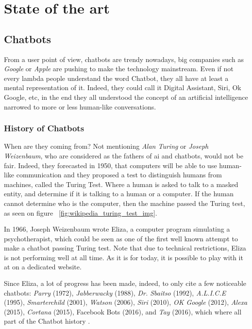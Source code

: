 

\chapter{State of the art}
\label{chap:state-of-the-art}

\section{Chatbots}
From a user point of view, chatbots are trendy nowadays, big companies such as \textit{Google} or \textit{Apple} are pushing to make the technology mainstream. Even if not every lambda people understand the word Chatbot, they all have at least a mental representation of it. Indeed, they could call it Digital Assistant, Siri, Ok Google, etc, in the end they all understood the concept of an artificial intelligence narrowed to more or less human-like conversations.

\subsection{History of Chatbots}
When are they coming from? Not mentioning \textit{Alan Turing} or \textit{Joseph Weizenbaum}, who are considered as the fathers of \gls{ai} and chatbots, would not be fair. Indeed, they forecasted in 1950, that computers will be able to use human-like communication and they proposed a test to distinguish humans from machines, called the Turing Test. Where a human is asked to talk to a masked entity, and determine if it is talking to a human or a computer. If the human cannot determine who is the computer, then the machine passed the Turing test, as seen on figure ~\ref{fig:wikipedia_turing_test_img}. 

In 1966, Joseph Weizenbaum wrote Eliza, a computer program simulating a psychotherapist, which could be seen as one of the first well known attempt to make a chatbot passing Turing test. Note that due to technical restrictions, Eliza is not performing well at all time. As it is for today, it is possible to play with it at on a dedicated website. \cite{chatbot:eliza}

Since Eliza, a lot of progress has been made, indeed, to only cite a few noticeable chatbots: \textit{Parry} (1972), \textit{Jabberwacky} (1988), \textit{Dr. Sbaitso} (1992), \textit{A.L.I.C.E} (1995), \textit{Smarterchild} (2001), \textit{Watson} (2006), \textit{Siri} (2010), \textit{OK Google} (2012), \textit{Alexa} (2015), \textit{Cortana} (2015), Facebook Bots (2016), and \textit{Tay} (2016), which where all part of the Chatbot history \cite{chatbot:futurism_history_infography}.

